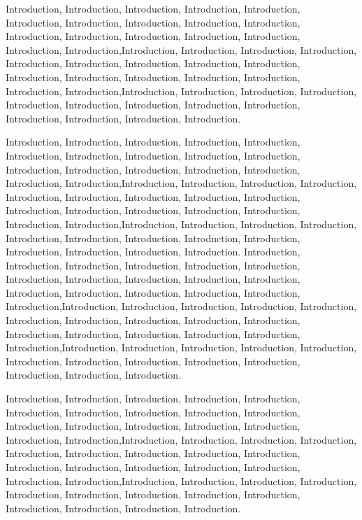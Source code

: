 Introduction, Introduction, Introduction, Introduction, Introduction, Introduction, Introduction, Introduction, Introduction, Introduction, Introduction, Introduction, Introduction, Introduction, Introduction, Introduction, Introduction,Introduction, Introduction, Introduction, Introduction, Introduction, Introduction, Introduction, Introduction, Introduction, Introduction, Introduction, Introduction, Introduction, Introduction, Introduction, Introduction,Introduction, Introduction, Introduction, Introduction, Introduction, Introduction, Introduction, Introduction, Introduction, Introduction, Introduction, Introduction, Introduction.

Introduction, Introduction, Introduction, Introduction, Introduction, Introduction, Introduction, Introduction, Introduction, Introduction, Introduction, Introduction, Introduction, Introduction, Introduction, Introduction, Introduction,Introduction, Introduction, Introduction, Introduction, Introduction, Introduction, Introduction, Introduction, Introduction, Introduction, Introduction, Introduction, Introduction, Introduction, Introduction, Introduction,Introduction, Introduction, Introduction, Introduction, Introduction, Introduction, Introduction, Introduction, Introduction, Introduction, Introduction, Introduction, Introduction.
Introduction, Introduction, Introduction, Introduction, Introduction, Introduction, Introduction, Introduction, Introduction, Introduction, Introduction, Introduction, Introduction, Introduction, Introduction, Introduction, Introduction,Introduction, Introduction, Introduction, Introduction, Introduction, Introduction, Introduction, Introduction, Introduction, Introduction, Introduction, Introduction, Introduction, Introduction, Introduction, Introduction,Introduction, Introduction, Introduction, Introduction, Introduction, Introduction, Introduction, Introduction, Introduction, Introduction, Introduction, Introduction, Introduction.

Introduction, Introduction, Introduction, Introduction, Introduction, Introduction, Introduction, Introduction, Introduction, Introduction, Introduction, Introduction, Introduction, Introduction, Introduction, Introduction, Introduction,Introduction, Introduction, Introduction, Introduction, Introduction, Introduction, Introduction, Introduction, Introduction, Introduction, Introduction, Introduction, Introduction, Introduction, Introduction, Introduction,Introduction, Introduction, Introduction, Introduction, Introduction, Introduction, Introduction, Introduction, Introduction, Introduction, Introduction, Introduction, Introduction.

